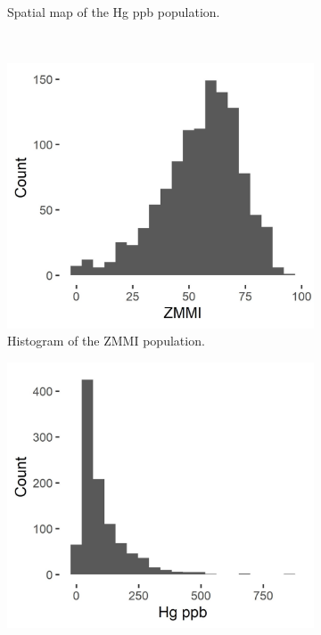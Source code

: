 \documentclass[]{elsarticle} %
\begin{document}
\begin{figure}
\begin{subfigure}{0.49\textwidth}
  \caption{Spatial map of the Hg ppb population.}
  \label{fig:mercury_map}
\end{subfigure} \\
\begin{subfigure}{0.49\textwidth}
  \centering
  \includegraphics[width = 1\linewidth]{figures/zmmi_hist.jpeg}
  \caption{Histogram of the ZMMI population.}
  \label{fig:zmmi_hist}
\end{subfigure}
\begin{subfigure}{0.49\textwidth}
  \centering
  \includegraphics[width = 1\linewidth]{figures/mercury_hist.jpeg}

\end{subfigure}
\end{figure}
\end{document}
